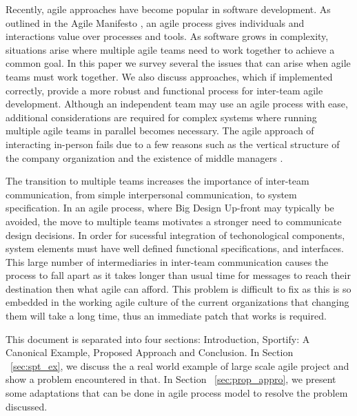 
Recently, agile approaches have become popular in software development.
As outlined in the Agile Manifesto \cite{beck2001agile}, an agile process gives individuals and interactions value over processes and tools.
As software grows in complexity, situations arise where multiple agile teams need to work together to achieve a common goal.
In this paper we survey several the issues that can arise when agile teams must work together.
We also discuss approaches, which if implemented correctly, provide a more robust and functional process for inter-team agile development. 
%
Although an independent team may use an agile process with ease, additional considerations are required for complex systems where running multiple agile teams in parallel becomes necessary.
The agile approach of interacting in-person fails due to a few reasons such as the vertical structure of the company organization and the existence of middle managers \cite{dzone_article}.

The transition to multiple teams increases the importance of inter-team communication, from simple interpersonal communication, to system specification. 
In an agile process, where Big Design Up-front may typically be avoided, the move to multiple teams motivates a stronger need to communicate design decisions.
In order for sucessful integration of techonological components, system elements must have well defined functional specifications, and interfaces.
This large number of intermediaries in inter-team communication causes the process to fall apart as it takes longer than usual time for messages to reach their destination then what agile can afford.
This problem is difficult to fix as this is so embedded in the working agile culture of the current organizations that changing them will take a long time, thus an immediate patch that works is required.




This document is separated into four sections: Introduction, Sportify: A Canonical Example, Proposed Approach and Conclusion. 
In Section ~\ref{sec:spt_ex}, we discuss the a real world example of large scale agile project and show a problem encountered in that.
In Section ~\ref{sec:prop_appro}, we present some adaptations that can be done in agile process model to resolve the problem discussed.